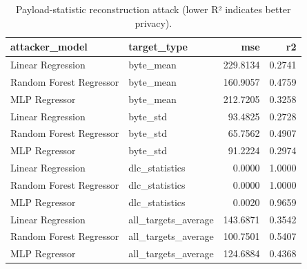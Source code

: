 \begin{table}[t]
\centering
\begin{tabular}{llrr}
\toprule
attacker\_model & target\_type & mse & r2 \\
\midrule
Linear Regression & byte\_mean & 229.8134 & 0.2741 \\
Random Forest Regressor & byte\_mean & 160.9057 & 0.4759 \\
MLP Regressor & byte\_mean & 212.7205 & 0.3258 \\
Linear Regression & byte\_std & 93.4825 & 0.2728 \\
Random Forest Regressor & byte\_std & 65.7562 & 0.4907 \\
MLP Regressor & byte\_std & 91.2224 & 0.2974 \\
Linear Regression & dlc\_statistics & 0.0000 & 1.0000 \\
Random Forest Regressor & dlc\_statistics & 0.0000 & 1.0000 \\
MLP Regressor & dlc\_statistics & 0.0020 & 0.9659 \\
Linear Regression & all\_targets\_average & 143.6871 & 0.3542 \\
Random Forest Regressor & all\_targets\_average & 100.7501 & 0.5407 \\
MLP Regressor & all\_targets\_average & 124.6884 & 0.4368 \\
\bottomrule
\end{tabular}
\caption{Payload-statistic reconstruction attack (lower R² indicates better privacy).}
\label{tab:payload-stat-recon}
\end{table}
